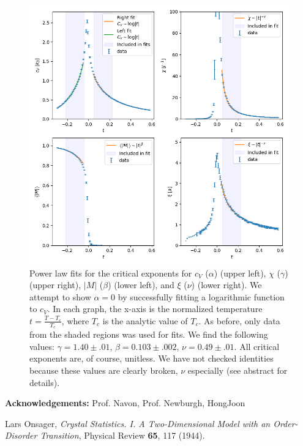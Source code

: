 \documentclass[letter,scriptaddress,twocolumn, prl]{revtex4}
\begin{document}
\begin{figure}[h]
	\begin{center}
		\includegraphics[width=1\textwidth]{figs/fig5_crit_exponents.png}
		\caption{Power law fits for the critical exponents for $c_V$ ($\alpha$) (upper left), $\chi$ ($\gamma$) (upper right), $|M|$ ($\beta$) (lower left), and $\xi$ ($\nu$) (lower right). We attempt to show $\alpha = 0$ by successfully fitting a logarithmic function to $c_V$. In each graph, the x-axis is the normalized temperature $t = \frac{T - T_c}{T_c}$, where $T_c$ is the analytic value of $T_c$. As before, only data from the shaded regions was used for fits. We find the following values: $\gamma = 1.40 \pm .01$, $\beta = 0.103 \pm .002$, $\nu = 0.49 \pm .01$. All critical exponents are, of course, unitless. We have not checked identities because these values are clearly broken, $\nu$ especially (see abstract for details).}
		\label{fig:fig5}
	\end{center}
\end{figure}

\textbf{Acknowledgements:}
	Prof. Navon, Prof. Newburgh, HongJoon

 
%

\begin{thebibliography}{}
	
	Lars Onsager,
	\textit{Crystal Statistics. I. A Two-Dimensional Model with an Order-Disorder Transition},
	Physical Review {\bf 65}, 117 (1944).
	
	
\end{thebibliography}
\end{document}
